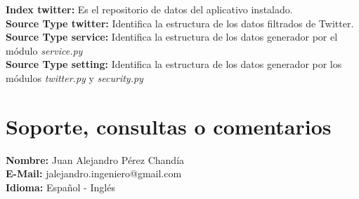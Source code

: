 \documentclass[a4paper]{article}
\begin{document}
\textbf{Index twitter: }Es el repositorio de datos del aplicativo instalado.\\
\textbf{Source Type twitter: }Identifica la estructura de los datos filtrados de Twitter.\\
\textbf{Source Type service: }Identifica la estructura de los datos generador por el m\'odulo \textit{service.py}\\
\textbf{Source Type setting: }Identifica la estructura de los datos generador por los m\'odulos \textit{twitter.py} y \textit{security.py}
\newline
\section{Soporte, consultas o comentarios}

\textbf{Nombre: }Juan Alejandro P\'erez Chand\'ia\\
\textbf{E-Mail: }jalejandro.ingeniero@gmail.com\\
\textbf{Idioma: }Espa\~nol - Ingl\'es
\end{document}
